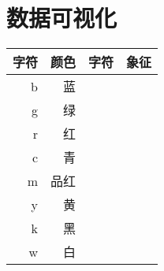 \chapter{数据可视化}
\begin{table}
    \centering
    \begin{tabular}{rrrr}
        \hline
        字符 & 颜色 & 字符 & 象征 \\
        \hline
        b  & 蓝  &    &    \\
        g  & 绿  &    &    \\
        r  & 红  &    &    \\
        c  & 青  &    &    \\
        m  & 品红 &    &    \\
        y  & 黄  &    &    \\
        k  & 黑  &    &    \\
        w  & 白  &    &    \\
        \hline
    \end{tabular}
\end{table}